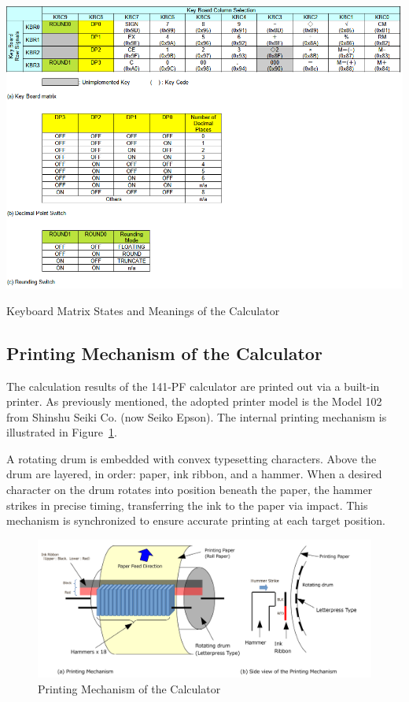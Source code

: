\begin{table}[htbp]
    \includegraphics[width=1.00\columnwidth]{./Table/KEYBOARD.png}
    \caption{Keyboard Matrix States and Meanings of the Calculator}
    \label{tb:KEYBOARD}
\end{table}

\subsection{Printing Mechanism of the Calculator}
The calculation results of the 141-PF calculator are printed out via a built-in printer. As previously mentioned, the adopted printer model is the Model 102 from Shinshu Seiki Co. (now Seiko Epson). The internal printing mechanism is illustrated in Figure~\ref{fig:PRINTINGMECHANISM}.

A rotating drum is embedded with convex typesetting characters. Above the drum are layered, in order: paper, ink ribbon, and a hammer. When a desired character on the drum rotates into position beneath the paper, the hammer strikes in precise timing, transferring the ink to the paper via impact. This mechanism is synchronized to ensure accurate printing at each target position.

\begin{figure}[htbp]
  \includegraphics[width=1.0\textwidth]{./Figure/PrintingMechanism.png}
  \caption{Printing Mechanism of the Calculator}
  \label{fig:PRINTINGMECHANISM}
\end{figure}

